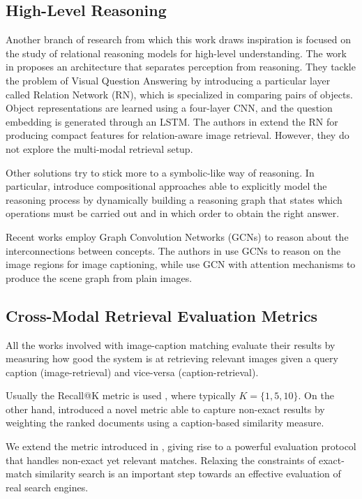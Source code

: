 \documentclass[acmsmall]{acmart}
\begin{document}
\subsection*{High-Level Reasoning}
Another branch of research from which this work draws inspiration is focused on the study of relational reasoning models for high-level understanding. The work in \cite{santoro2017rn} proposes an architecture that separates perception from reasoning. They tackle the problem of Visual Question Answering by introducing a particular layer called Relation Network (RN), which is specialized in comparing pairs of objects. Object representations are learned using a four-layer CNN, and the question embedding is generated through an LSTM. The authors in \cite{messina2019avfrn,DBLP:messina2019cbir} extend the RN for producing compact features for relation-aware image retrieval. However, they do not explore the multi-modal retrieval setup.

Other solutions try to stick more to a symbolic-like way of reasoning. In particular, \cite{hu2017learning,inferring_and_executing_programs} introduce compositional approaches able to explicitly model the reasoning process by dynamically building a reasoning graph that states which operations must be carried out and in which order to obtain the right answer.

Recent works employ Graph Convolution Networks (GCNs) to reason about the interconnections between concepts. The authors in \cite{YaoPLM18,YangTZC19,LiJ19} use GCNs to reason on the image regions for image captioning, while \cite{YangLLBP18graphrcnn,LiOZSZW18} use GCN with attention mechanisms to produce the scene graph from plain images.

\subsection*{Cross-Modal Retrieval Evaluation Metrics}
All the works involved with image-caption matching evaluate their results by measuring how good the system is at retrieving relevant images given a query caption (image-retrieval) and vice-versa (caption-retrieval). 

Usually the Recall@K metric is used \cite{vsepp2018faghri,li2019,qi2020imagebert,lu2019vilbert,lee2019}, where typically $K = \{1, 5, 10\}$.
On the other hand, \cite{carrara2018pictureit} introduced a novel metric able to capture non-exact results by weighting the ranked documents using a caption-based similarity measure.

We extend the metric introduced in \cite{carrara2018pictureit}, giving rise to a powerful evaluation protocol that handles non-exact yet relevant matches. Relaxing the constraints of exact-match similarity search is an important step towards an effective evaluation of real search engines.
\end{document}
